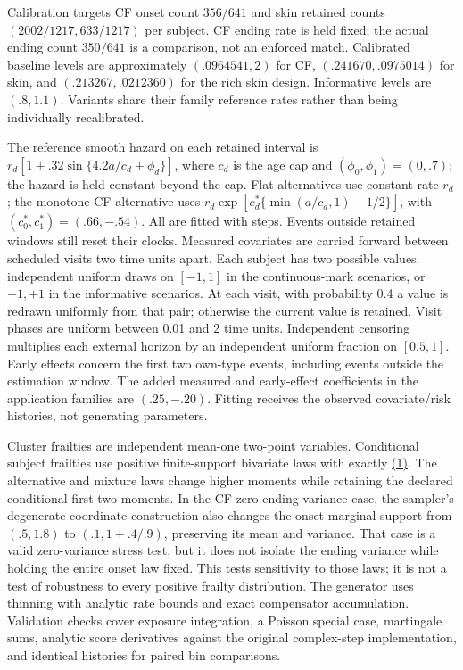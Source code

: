 \documentclass[11pt]{article}
\begin{document}
Calibration targets CF onset count \(356/641\) and skin retained counts \((2002/1217,633/1217)\) per subject. CF ending rate is held fixed; the actual ending count \(350/641\) is a comparison, not an enforced match. Calibrated baseline levels are approximately \((.0964541,2)\) for CF, \((.241670,.0975014)\) for skin, and \((.213267,.0212360)\) for the rich skin design. Informative levels are \((.8,1.1)\). Variants share their family reference rates rather than being individually recalibrated.

The reference smooth hazard on each retained interval is \(r_d[1+.32\sin\{4.2a/c_d+\phi_d\}]\), where \(c_d\) is the age cap and \((\phi_0,\phi_1)=(0,.7)\); the hazard is held constant beyond the cap. Flat alternatives use constant rate \(r_d\); the monotone CF alternative uses \(r_d\exp[c_d^*\{\min(a/c_d,1)-1/2\}]\), with \((c_0^*,c_1^*)=(.66,-.54)\). All are fitted with steps. Events outside retained windows still reset their clocks. Measured covariates are carried forward between scheduled visits two time units apart. Each subject has two possible values: independent uniform draws on \([-1,1]\) in the continuous-mark scenarios, or \(-1,+1\) in the informative scenarios. At each visit, with probability 0.4 a value is redrawn uniformly from that pair; otherwise the current value is retained. Visit phases are uniform between 0.01 and 2 time units. Independent censoring multiplies each external horizon by an independent uniform fraction on \([0.5,1]\). Early effects concern the first two own-type events, including events outside the estimation window. The added measured and early-effect coefficients in the application families are \((.25,-.20)\). Fitting receives the observed covariate/risk histories, not generating parameters.

Cluster frailties are independent mean-one two-point variables. Conditional subject frailties use positive finite-support bivariate laws with exactly \hyperref[eq:1]{(1)}. The alternative and mixture laws change higher moments while retaining the declared conditional first two moments. In the CF zero-ending-variance case, the sampler's degenerate-coordinate construction also changes the onset marginal support from \((.5,1.8)\) to \((.1,1+.4/.9)\), preserving its mean and variance. That case is a valid zero-variance stress test, but it does not isolate the ending variance while holding the entire onset law fixed. This tests sensitivity to those laws; it is not a test of robustness to every positive frailty distribution. The generator uses thinning with analytic rate bounds and exact compensator accumulation. Validation checks cover exposure integration, a Poisson special case, martingale sums, analytic score derivatives against the original complex-step implementation, and identical histories for paired bin comparisons.
\end{document}
